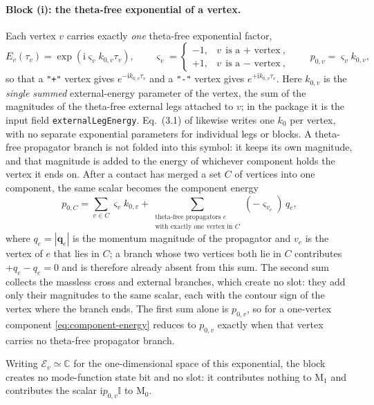 \documentclass[11pt,a4paper]{article}
\numberwithin{table}{section}
\newcommand{\ii}{\mathrm i}
\newcommand{\Id}{\mathbb I}
\newcommand{\cE}{\mathcal E}
\begin{document}
\paragraph{Block (i): the theta-free exponential of a vertex.}
Each vertex $v$ carries exactly \emph{one} theta-free exponential factor,
\begin{equation}
  E_v(\tau_v)=\exp\!\left(\ii\varsigma_v k_{0,v}\tau_v\right),
  \qquad
  \varsigma_v=\begin{cases}-1,&v\ \text{is a $+$ vertex},\\[2pt]
  +1,&v\ \text{is a $-$ vertex},\end{cases}
  \qquad p_{0,v}=\varsigma_vk_{0,v},
  \label{eq:phase-block}
\end{equation}
so that a \texttt{"+"} vertex gives $e^{-\ii k_{0,v}\tau_v}$ and a \texttt{"-"} vertex gives
$e^{+\ii k_{0,v}\tau_v}$. Here $k_{0,v}$ is the
\emph{single summed} external-energy parameter of the vertex, the sum of the magnitudes of the theta-free
external legs attached to $v$; in the package it is the input field \texttt{externalLegEnergy}.
Eq.~(3.1) of \cite{Chen:2023iix}
likewise writes one $k_0$ per vertex, with no separate exponential parameters for individual legs or blocks. A theta-free propagator branch is not folded into
this symbol: it keeps its own magnitude, and that magnitude is added to the energy of whichever
component holds the vertex it ends on. After a contact has merged a set $C$ of vertices
into one component, the same scalar becomes the component energy
\begin{equation}
  p_{0,C}=\sum_{v\in C}\varsigma_vk_{0,v}
  +\!\!\sum_{\substack{\text{theta-free propagators }e\\[-1pt]
  \text{with exactly one vertex in }C}}\!\!(-\varsigma_{v_e})\,q_e,
  \label{eq:component-energy}
\end{equation}
where $q_e=|\bm q_e|$ is the momentum magnitude of the propagator and $v_e$ is the vertex of $e$ that
lies in $C$; a branch whose two vertices both lie in $C$ contributes $+q_e-q_e=0$ and is therefore
already absent from this sum. The
second sum collects the massless cross and external branches, which create no slot: they add only
their magnitudes to the same scalar, each with the contour sign of the vertex where the branch ends. The
first sum alone is $p_{0,v}$, so for a one-vertex component \eqref{eq:component-energy} reduces to
$p_{0,v}$ exactly when that vertex carries no theta-free propagator branch.

Writing $\cE_v\simeq\mathbb C$ for the one-dimensional space of this exponential, the
block creates no mode-function state bit and no slot: it contributes nothing to
$\text{M}_1$ and contributes the scalar $\ii p_{0,v}\Id$ to $\text{M}_0$.
\end{document}

